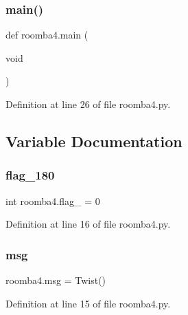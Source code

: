 \subsubsection{\texorpdfstring{main()}{main()}}
{\footnotesize\ttfamily def roomba4.\+main (\begin{DoxyParamCaption}\item[{void}]{ }\end{DoxyParamCaption})}



Definition at line 26 of file roomba4.\+py.



\subsection{Variable Documentation}
\mbox{\label{namespaceroomba4_a248d08a914d5acc819e11595fb012a55}} 
\subsubsection{\texorpdfstring{flag\_180}{flag\_180}}
{\footnotesize\ttfamily int roomba4.\+flag\+\_ = 0}



Definition at line 16 of file roomba4.\+py.

\mbox{\label{namespaceroomba4_a57ff4960b95c34c06c1363c203bcbb4b}} 
\subsubsection{\texorpdfstring{msg}{msg}}
{\footnotesize\ttfamily roomba4.\+msg = Twist()}



Definition at line 15 of file roomba4.\+py.

